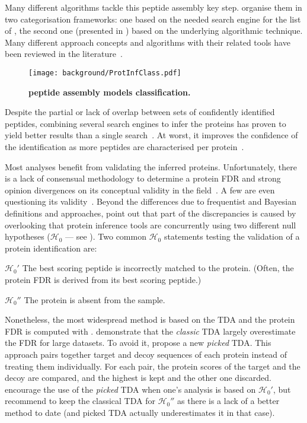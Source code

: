 Many different algorithms tackle this peptide assembly key step.
\citet{Huang2012-nr} organise them in two categorisation frameworks:
one based on the needed search engine for the list of \psms,
the second one (presented in )
based on the underlying algorithmic technique.
Many different approach concepts and algorithms with their related tools
have been reviewed in the literature~.

\begin{figure}[!htb]
    \texttt{[image: background/ProtInfClass.pdf]}\centering
    \caption[Peptide assembly models classification]{\label{fig:ProtInfClass}%
    \textbf{\citet{Huang2012-nr} peptide assembly models classification.}
    }
\end{figure}

Despite the partial or lack of overlap between
sets of confidently identified peptides,
combining several search engines to infer the proteins
has proven to yield better results than a single search~.
At worst, it improves the confidence of the identification
as more peptides are characterised per protein~.

Most analyses benefit from validating the inferred proteins.
Unfortunately,
there is a lack of consensual methodology
to determine a protein \gls{FDR}
and strong opinion divergences on its conceptual validity
in the field~.
A few are even questioning its validity~.
Beyond the differences due to frequentist and Bayesian definitions and approaches,
\citet{The2016-ua} point out that part of the discrepancies is caused by
overlooking that protein inference tools are concurrently using
two different null hypotheses ($\mathcal{H}_0$ --- see ).
Two common $\mathcal{H}_0$ statements testing
the validation of a protein identification are:
\begin{eqlist}
    \item[$\mathcal{H}_0'$] The best scoring peptide is incorrectly matched to the protein.
        (Often, the protein \gls{FDR} is derived from its best scoring peptide.)
    \item[$\mathcal{H}_0''$] The protein is absent from the sample.
\end{eqlist}

Nonetheless, the most widespread method is based on the \gls{TDA}
and the protein \gls{FDR} is computed with .
\citet{Savitski2015-fx} demonstrate that the \emph{classic} \gls{TDA}
largely overestimate the \gls{FDR} for large datasets.
To avoid it,
\citet{Savitski2015-fx} propose a new \emph{picked} \gls{TDA}.
This approach pairs together target and decoy sequences of each protein
instead of treating them individually.
For each pair, the protein scores of the target and the decoy are compared,
and the highest is kept and the other one discarded.
\citet{The2016-ua} encourage the use of the \emph{picked} \gls{TDA}
when one's analysis is based on $\mathcal{H}_0'$,
but recommend to keep the classical \gls{TDA} for $\mathcal{H}_0''$
as there is a lack of a better method to date
(and picked \gls{TDA} actually underestimates it in that case).

